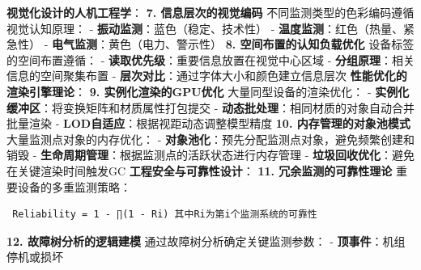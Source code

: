 \textbf{视觉化设计的人机工程学}： \textbf{7. 信息层次的视觉编码} 不同监测类型的色彩编码遵循视觉认知原理： - \textbf{振动监测}：蓝色（稳定、技术性） - \textbf{温度监测}：红色（热量、紧急性） - \textbf{电气监测}：黄色（电力、警示性） \textbf{8. 空间布置的认知负载优化} 设备标签的空间布置遵循： - \textbf{读取优先级}：重要信息放置在视觉中心区域 - \textbf{分组原理}：相关信息的空间聚集布置 - \textbf{层次对比}：通过字体大小和颜色建立信息层次 \textbf{性能优化的渲染引擎理论}： \textbf{9. 实例化渲染的GPU优化} 大量同型设备的渲染优化： - \textbf{实例化缓冲区}：将变换矩阵和材质属性打包提交 - \textbf{动态批处理}：相同材质的对象自动合并批量渲染 - \textbf{LOD自适应}：根据视距动态调整模型精度 \textbf{10. 内存管理的对象池模式} 大量监测点对象的内存优化： - \textbf{对象池化}：预先分配监测点对象，避免频繁创建和销毁 - \textbf{生命周期管理}：根据监测点的活跃状态进行内存管理 - \textbf{垃圾回收优化}：避免在关键渲染时间触发GC \textbf{工程安全与可靠性设计}： \textbf{11. 冗余监测的可靠性理论} 重要设备的多重监测策略： \begin{verbatim} Reliability = 1 - ∏(1 - Ri) 其中Ri为第i个监测系统的可靠性 \end{verbatim} \textbf{12. 故障树分析的逻辑建模} 通过故障树分析确定关键监测参数： - \textbf{顶事件}：机组停机或损坏 